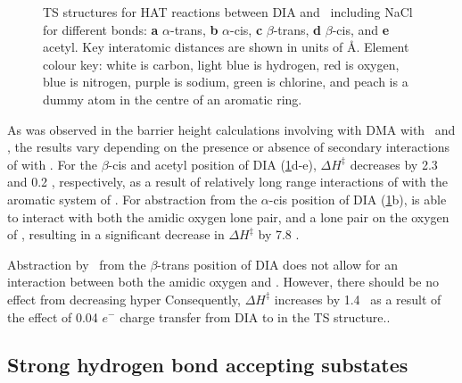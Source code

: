 \begin{figure}
  \caption[TS structures for HAT reaction between DIA and \cumo\ including NaCl.]{TS structures for HAT reactions between DIA and \cumo\ including NaCl for different  bonds: \textbf{a} $\alpha$-trans, \textbf{b} $\alpha$-cis, \textbf{c} $\beta$-trans, \textbf{d} $\beta$-cis, and \textbf{e} acetyl. Key interatomic distances are shown in units of \AA. Element colour key: white is carbon, light blue is hydrogen, red is oxygen, blue is nitrogen, purple is sodium, green is chlorine, and peach is a dummy atom in the centre of an aromatic ring.}
  \label{fig:dia-cumo-ts}
\end{figure}

As was observed in the barrier height calculations involving  with DMA with \bno\ and \cumo, the results vary depending on the presence or absence of secondary interactions of  with \cumo. For the $\beta$-cis and acetyl position of DIA (\ref{fig:dia-cumo-ts}d-e), $\Delta H^\ddagger$ decreases by 2.3 and 0.2 \kcalmol, respectively, as a result of relatively long range interactions of  with the aromatic system of \cumo. For abstraction from the $\alpha$-cis position of DIA (\ref{fig:dia-cumo-ts}b),  is able to interact with both the amidic oxygen lone pair, and a lone pair on the oxygen of \cumo, resulting in a significant decrease in $\Delta H^\ddagger$ by 7.8 \kcalmol.


Abstraction by \cumo\ from the $\beta$-trans position of DIA does not allow for an interaction between both the amidic oxygen and \cumo. However, there should be no effect from decreasing hyper Consequently, $\Delta H^\ddagger$ increases by 1.4 \kcalmol\ as a result of the effect of 0.04 $e^-$ charge transfer from DIA to  in the TS structure..



\subsection{Strong hydrogen bond accepting substates}

